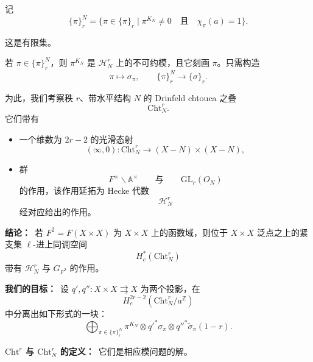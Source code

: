 记
\[ \{\pi\}^N_r = \{\pi \in \{\pi\}_r \mid \pi^{K_N} \neq 0 \quad \text{且} \quad \chi_\pi(a) = 1\}. \]

这是有限集。

若 $\pi \in \{\pi\}^N_r$，则 $\pi^{K_N}$ 是 $\mathcal{H}^r_N$ 上的不可约模，且它刻画 $\pi$。只需构造
\[ \pi \mapsto \sigma_\pi, \qquad \{\pi\}^N_r \to \{\sigma\}_r. \]

为此，我们考察秩 $r$、带水平结构 $N$ 的 Drinfeld chtouca 之叠
\[ \mathrm{Cht}^r_N. \]
它们带有
\begin{itemize}
\item 一个维数为 $2r - 2$ 的光滑态射
\[ (\infty, 0) : \mathrm{Cht}^r_N \to (X - N) \times (X - N), \]
\item 群
\[ F^\times\backslash \mathbb{A}^\times \qquad \text{与} \qquad \mathrm{GL}_r(O_N) \]
的作用，该作用延拓为 Hecke 代数
\[ \mathcal{H}^r_N \]
经对应给出的作用。
\end{itemize}

\par\medskip\noindent\textbf{结论：}\ 若 $F^2 = F(X \times X)$ 为 $X \times X$ 上的函数域，则位于 $X \times X$ 泛点之上的紧支集 $\ell$-进上同调空间
\[ H^*_c(\mathrm{Cht}^r_N) \]
带有 $\mathcal{H}^r_N$ 与 $G_{F^2}$ 的作用。

\par\medskip\noindent\textbf{我们的目标：}\ 设 $q', q'' : X \times X \rightrightarrows X$ 为两个投影，在
\[ H^{2r-2}_c(\mathrm{Cht}^r_N/a^{\mathbb{Z}}) \]
中分离出如下形式的一块：
\[ \bigoplus_{\pi \in \{\pi\}^N_r} \pi^{K_N} \otimes q'^*\sigma_\pi \otimes q''^*\tilde{\sigma}_\pi(1-r). \]

\par\medskip\noindent\textbf{$\mathrm{Cht}^r$ 与 $\mathrm{Cht}^r_N$ 的定义：}\ 它们是相应模问题的解。

